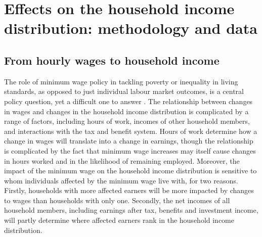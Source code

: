 
\section{Effects on the household income distribution: methodology and data} \label{sec:hh_methodology}

\subsection{From hourly wages to household income} \label{sec:hh_conceptual}

The role of minimum wage policy in tackling poverty or inequality in living standards, as opposed to just individual labour market outcomes, is a central policy question, yet a difficult one to answer \citep{Dube2019}. The relationship between changes in wages and changes in the household income distribution is complicated by a range of factors, including hours of work, incomes of other household members, and interactions with the tax and benefit system. Hours of work determine how a change in wages will translate into a change in earnings, though the relationship is complicated by the fact that minimum wage increases may itself cause changes in hours worked and in the likelihood of remaining employed. Moreover, the impact of the minimum wage on the household income distribution is sensitive to whom individuals affected by the minimum wage live with, for two reasons. Firstly, households with more affected earners will be more impacted by changes to wages than households with only one. Secondly, the net incomes of all household members, including earnings after tax, benefits and investment income, will partly determine where affected earners rank in the household income distribution. \par

